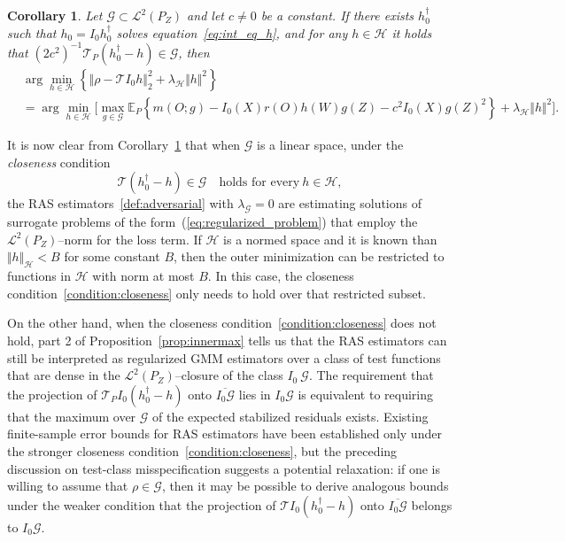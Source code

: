 \documentclass[twoside,11pt]{article}
\newtheorem{corollary}{Corollary}
\newcommand{\mc}{\mathcal}
\begin{document}
\begin{corollary}
 Let $\mc{G}\subset\mc{L}^2(P_{Z})$ and let $c \ne 0$ be a constant. If there exists $h_0^\dag$ such that  $h_0=I_0h_0^\dag$ solves equation~\eqref{eq:int_eq_h}, and for any $h\in \mc{H}$ it holds that $(2c^2)^{-1}\mc{T}_{P}(h_0^\dag-h)\in\mc{G}$, then 
\begin{align*}
     &\arg\min_{h \in \mc{H}}\left\{\Vert \rho-\mc{T}I_0h\Vert_2^2+\lambda_\mc{H}\Vert h\Vert^2\right\}\\
     &=\arg\min_{h \in \mc{H}}\big[\max_{g\in \mc{G}} \mathbb{E}_P\left\{m(O;g)-I_0(X)r(O)h(W)g(Z)-c^2I_0(X)g(Z)^2\right\}+\lambda_\mc{H}\Vert h\Vert^2\big].\nonumber %
\end{align*}
\label{corollary:closed_arg_max}
\end{corollary}
It is now clear from Corollary~\ref{corollary:closed_arg_max} that when $\mc{G}$ is a linear space, under the \textit{closeness} condition 
\begin{equation}
\mc{T}(h_0^\dag-h)\in\mc{G} \quad \text{holds for every} \: h \in \mc{H},
\label{condition:closeness}
\end{equation}
the RAS estimators~\eqref{def:adversarial} with $\lambda_\mc{G}=0$ are estimating solutions of surrogate problems of the form~(\ref{eq:regularized_problem}) that employ the $\mc{L}^2(P_Z)$--norm for the loss term. 
If $\mc{H}$ is a normed space and it is known than $\Vert h\Vert_\mc{H}<B$ for some constant $B$, then the outer minimization can be restricted to functions in $\mc{H}$ with norm at most $B$. In this case, the closeness condition~\eqref{condition:closeness} only needs to hold over that restricted subset.

On the other hand, when the closeness condition~\eqref{condition:closeness} does not hold, part 2 of Proposition~\ref{prop:innermax} tells us that the RAS estimators can still be interpreted as regularized GMM estimators over a class of test functions that are dense in the $\mathcal{L}^2(P_Z)$–closure of the class $I_0 \: \mathcal{G}$. The requirement that the projection of $\mathcal{T}_{P} I_0(h_0^\dag - h)$ onto $\overline{I_0\mc{G}}$ lies in $I_0 \mathcal{G}$ is equivalent to requiring that the maximum over $\mathcal{G}$ of the expected stabilized residuals exists. Existing finite-sample error bounds for RAS estimators have been established only under the stronger closeness condition~\eqref{condition:closeness}, but the preceding discussion on test-class misspecification suggests a potential relaxation: if one is willing to assume that $\rho \in \mathcal{G}$, then it may be possible to derive analogous bounds under the weaker condition that the projection of $\mathcal{T} I_0(h_0^\dag - h)$ onto $\overline{I_0 \mathcal{G}}$ belongs to $I_0 \mathcal{G}$.
\end{document}
